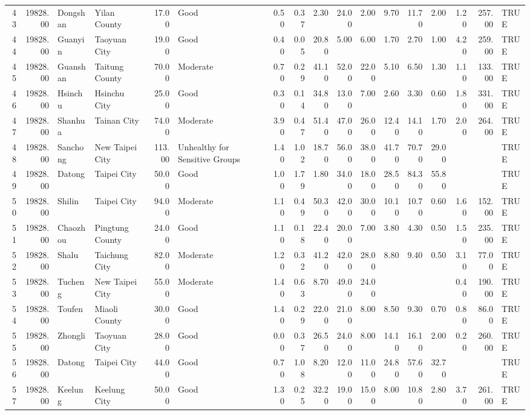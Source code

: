 \begin{table}[ht]
\begin{tabular}{rrllrlrrrrrrrrrrl}
  43 & 19828.00 & Dongshan & Yilan County & 17.00 & Good & 0.50 & 0.37 & 2.30 & 24.00 & 2.00 & 9.70 & 11.70 & 2.00 & 1.20 & 257.00 & TRUE \\ 
  44 & 19828.00 & Guanyin & Taoyuan City & 19.00 & Good & 0.40 & 0.05 & 20.80 & 5.00 & 6.00 & 1.70 & 2.70 & 1.00 & 4.20 & 259.00 & TRUE \\ 
  45 & 19828.00 & Guanshan & Taitung County & 70.00 & Moderate & 0.70 & 0.29 & 41.10 & 52.00 & 22.00 & 5.10 & 6.50 & 1.30 & 1.10 & 133.00 & TRUE \\ 
  46 & 19828.00 & Hsinchu & Hsinchu City & 25.00 & Good & 0.30 & 0.14 & 34.80 & 13.00 & 7.00 & 2.60 & 3.30 & 0.60 & 1.80 & 331.00 & TRUE \\ 
  47 & 19828.00 & Shanhua & Tainan City & 74.00 & Moderate & 3.90 & 0.47 & 51.40 & 47.00 & 26.00 & 12.40 & 14.10 & 1.70 & 2.00 & 264.00 & TRUE \\ 
  48 & 19828.00 & Sanchong & New Taipei City & 113.00 & Unhealthy for Sensitive Groups & 1.40 & 1.02 & 18.70 & 56.00 & 38.00 & 41.70 & 70.70 & 29.00 &  &  & TRUE \\ 
  49 & 19828.00 & Datong & Taipei City & 50.00 & Good & 1.00 & 1.79 & 1.80 & 34.00 & 18.00 & 28.50 & 84.30 & 55.80 &  &  & TRUE \\ 
  50 & 19828.00 & Shilin & Taipei City & 94.00 & Moderate & 1.10 & 0.49 & 50.30 & 42.00 & 30.00 & 10.10 & 10.70 & 0.60 & 1.60 & 152.00 & TRUE \\ 
  51 & 19828.00 & Chaozhou & Pingtung County & 24.00 & Good & 1.10 & 0.18 & 22.40 & 20.00 & 7.00 & 3.80 & 4.30 & 0.50 & 1.50 & 235.00 & TRUE \\ 
  52 & 19828.00 & Shalu & Taichung City & 82.00 & Moderate & 1.20 & 0.32 & 41.20 & 42.00 & 28.00 & 8.80 & 9.40 & 0.50 & 3.10 & 77.00 & TRUE \\ 
  53 & 19828.00 & Tucheng & New Taipei City & 55.00 & Moderate & 1.40 & 0.63 & 8.70 & 49.00 & 24.00 &  &  &  & 0.40 & 190.00 & TRUE \\ 
  54 & 19828.00 & Toufen & Miaoli County & 30.00 & Good & 1.40 & 0.29 & 22.00 & 21.00 & 8.00 & 8.50 & 9.30 & 0.70 & 0.80 & 86.00 & TRUE \\ 
  55 & 19828.00 & Zhongli & Taoyuan City & 28.00 & Good & 0.00 & 0.37 & 26.50 & 24.00 & 8.00 & 14.10 & 16.10 & 2.00 & 0.20 & 260.00 & TRUE \\ 
  56 & 19828.00 & Datong & Taipei City & 44.00 & Good & 0.70 & 1.08 & 8.20 & 12.00 & 11.00 & 24.80 & 57.60 & 32.70 &  &  & TRUE \\ 
  57 & 19828.00 & Keelung & Keelung City & 50.00 & Good & 1.30 & 0.25 & 32.20 & 19.00 & 15.00 & 8.00 & 10.80 & 2.80 & 3.70 & 261.00 & TRUE \\ 

\end{tabular}
\end{table}
